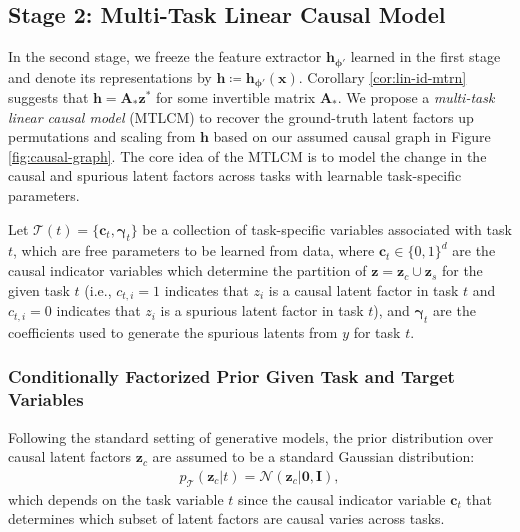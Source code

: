 \documentclass[10pt]{article} %
\theoremstyle{plain}
\theoremstyle{definition}
\begin{document}
\subsection{Stage 2: Multi-Task Linear Causal Model} 
In the second stage, we freeze the feature extractor $\mathbf{h}_{\boldsymbol{\phi}'}$ learned in the first stage and denote its representations by $\mathbf{h}\coloneqq\mathbf{h}_{\boldsymbol{\phi}'}(\mathbf{x})$. Corollary \ref{cor:lin-id-mtrn} suggests that $\mathbf{h}=\mathbf{A}_{*}\mathbf{z}^*$ for some invertible matrix $\mathbf{A}_{*}$. 
We propose a \textit{multi-task linear causal model} (MTLCM) to recover the ground-truth latent factors up permutations and scaling from $\mathbf{h}$ based on our assumed causal graph in Figure \ref{fig:causal-graph}. The core idea of the MTLCM is to model the change in the causal and spurious latent factors across tasks with learnable task-specific parameters.

Let $\mathcal{T}(t)=\{\mathbf{c}_t,\boldsymbol{\gamma}_t\}$ be a collection of task-specific variables associated with task $t$, which are free parameters to be learned from data, where $\mathbf{c}_t\in\{0,1\}^d$ are the causal indicator variables which determine the partition of $\mathbf{z}=\mathbf{z}_c\cup\mathbf{z}_s$ for the given task $t$ (i.e., $c_{t,i}=1$ indicates that $z_i$ is a causal latent factor in task $t$ and $c_{t,i}=0$ indicates that $z_i$ is a spurious latent factor in task $t$), and $\boldsymbol{\gamma}_t$ are the coefficients used to generate the spurious latents from $y$ for task $t$. 

\subsubsection{Conditionally Factorized Prior Given Task and Target Variables}
Following the standard setting of generative models, the prior distribution over causal latent factors $\mathbf{z}_c$ are assumed to be a standard Gaussian distribution:
\begin{align}
    p_{\mathcal{T}}(\mathbf{z}_c|t)=\mathcal{N}(\mathbf{z}_c|\mathbf{0},\mathbf{I}),\label{eq:causal_prior}
\end{align}
which depends on the task variable $t$ since the causal indicator variable $\mathbf{c}_t$ that determines which subset of latent factors are causal varies across tasks.
\end{document}
